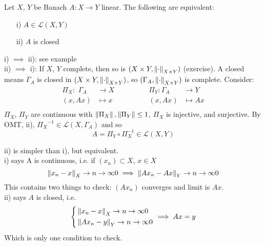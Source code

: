 \begin{theorem}\label{CGT}\nl
Let $X$, $Y$ be Banach $A:X\to Y$ linear. The following are equivalent:
\begin{itemize}
    \item [i)] $A\in\mathcal{L}(X,Y)$
    \item [ii)] $A$ is closed
\end{itemize} 
\begin{pf}{}{}
    i) $\implies$ ii): see example\\
    ii) $\implies$ i): If $X$, $Y$ complete, then so is $(X\times Y,\left\|{\cdot}\right\|_{X\times Y})$ (exercise). A closed means $\Gamma_A$ is closed in $(X\times Y,\left\|{\cdot}\right\|_{X\times Y})$, so $(\Gamma_A,\left\|{\cdot}\right\|_{X\times Y})$ is complete. Consider:
    \begin{equation}
        \begin{aligned}
            \Pi_X:\,\,\Gamma_A&\to X \qquad\qquad& \Pi_Y:\Gamma_A&\to Y\\
        (x,Ax)&\mapsto x  & (x,Ax)&\mapsto Ax\\
        \end{aligned}    
    \end{equation}
$\Pi_X$, $\Pi_Y$ are continuous with $\left\|{\Pi_X}\right\|,\left\|{\Pi_Y}\right\|\leq 1$, $\Pi_X$ is injective, and surjective. By OMT, ii), ${\Pi_X}^{-1}\in\mathcal{L}{(X,\Gamma_A)}$ and so
$$
A=\Pi_Y\circ \Pi_X^{-1}\in\mathcal{L}(X,Y)
$$
\end{pf}
\end{theorem}

\begin{remark}
	ii) is simpler than i), but equivalent.\\
	i) says A is continuous, i.e. if $(x_n)\subset X$, $x\in X$
	$$\left\|{x_n-x}\right\|_X\rightarrow{n\to\infty}0\implies\left\|{Ax_n-Ax}\right\|_Y\rightarrow{n\to\infty}0$$
	This contains two things to check: $(Ax_n)$ converges and limit is $Ax$.\\
	ii) says $A$ is closed, i.e.
	\begin{equation}
		\left\{
		\begin{aligned}
			&\left\|{x_n-x}\right\|_X\rightarrow{n\to\infty}0\\
			&\left\|{Ax_n-y}\right\|_Y\rightarrow{n\to\infty}0\\
		\end{aligned}
		\right.\implies
		Ax=y
	\end{equation}
	Which is only one condition to check.
\end{remark}

